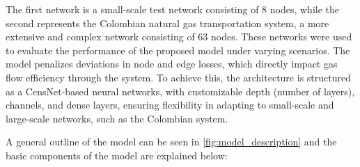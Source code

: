 The first network is a small-scale test network consisting of 8 nodes, while the second represents the Colombian natural gas transportation system, a more extensive and complex network consisting of 63 nodes. These networks were used to evaluate the performance of the proposed model under varying scenarios. The model penalizes deviations in node and edge losses, which directly impact gas flow efficiency through the system. To achieve this, the architecture is structured as a CensNet-based neural networks, with customizable depth (number of layers), channels, and dense layers, ensuring flexibility in adapting to small-scale and large-scale networks, such as the Colombian system.

A general outline of the model can be seen in \cref{fig:model_description} and the basic components of the model are explained below:

